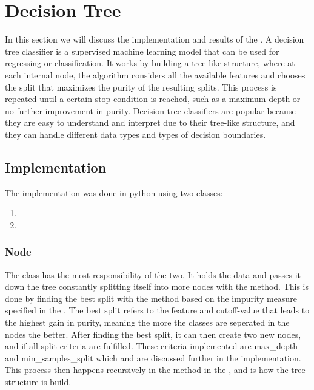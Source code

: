 \section{Decision Tree}
In this section we will discuss the implementation and results of the .
A decision tree classifier is a supervised machine learning model that can be used for regressing or classification.
It works by building a tree-like structure, where at each internal node, the algorithm considers all the available features and chooses the split that maximizes the purity of the resulting splits.
This process is repeated until a certain stop condition is reached, such as a maximum depth or no further improvement in purity.
Decision tree classifiers are popular because they are easy to understand and interpret due to their tree-like structure, and they can handle different data types and types of decision boundaries. \\

\subsection{Implementation}
The implementation was done in python using two classes:
\begin{enumerate}
    \item {}
    \item {}
    \end{enumerate}
\vspace{10pt}

\subsubsection{Node}
The  class has the most responsibility of the two.
It holds the data and passes it down the tree constantly splitting itself into more nodes with the  method.
This is done by finding the best split with the  method based on the impurity measure specified in the .
The best split refers to the feature and cutoff-value that leads to the highest gain in purity, meaning the more the classes are seperated in the nodes the better.
After finding the best split, it can then create two new nodes,  and  if all split criteria are fulfilled.
These criteria implemented are max\_depth and min\_samples\_split which and are discussed further in the  implementation.
This process then happens recursively in the  method in the , and is how the tree-structure is build. \\
